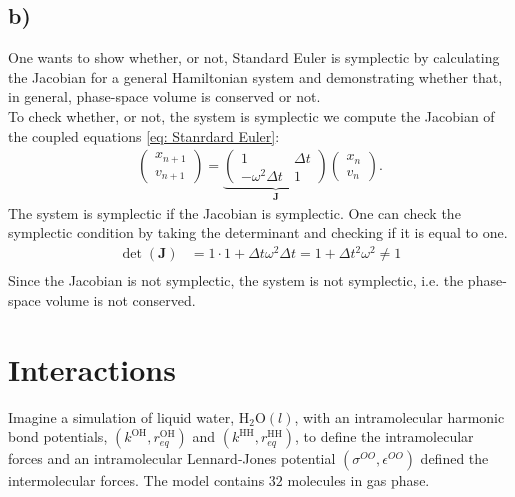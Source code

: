 \documentclass[a4paper]{article}
\newcommand{\w}{\omega}
\newcommand{\nl}{\\\newline\noindent}
\begin{document}
\subsection*{b)}
One wants to show whether, or not, Standard Euler is symplectic by calculating the Jacobian for a general Hamiltonian system and demonstrating whether that, in general, phase-space volume is conserved or not.
\nl
To check whether, or not, the system is symplectic we compute the Jacobian of the coupled equations \eqref{eq: Stanrdard Euler}:
\begin{align*}
    \begin{pmatrix}
        x_{n+1}\\
        v_{n+1}
    \end{pmatrix} = \underbrace{\begin{pmatrix}
        1 & \Delta t\\
        -\w^2\Delta t & 1
    \end{pmatrix}}_{\mathbf{J}}\begin{pmatrix}x_n\\v_n\end{pmatrix}.
\end{align*}The system is symplectic if the Jacobian is symplectic. One can check the symplectic condition by taking the determinant and checking if it is equal to one.
\begin{align*}
    \det(\mathbf{J}) &= 1\cdot 1 + \Delta t\w^2\Delta t = 1 + \Delta t^2\w^2\neq 1\\
\end{align*}
Since the Jacobian is not symplectic, the system is not symplectic, i.e. the phase-space volume is not conserved.

\section*{Interactions}
Imagine a simulation of liquid water, H$_2$O$(l)$, with an intramolecular harmonic bond potentials, $(k^{\text{OH}}, r_{eq}^\text{OH})$ and $(k^{\text{HH}}, r_{eq}^{\text{HH}})$,
to define the intramolecular forces and an intramolecular Lennard-Jones potential $(\sigma^{OO}, \epsilon^{OO})$ defined the intermolecular forces.
The model contains $32$ molecules in gas phase. 
\end{document}
